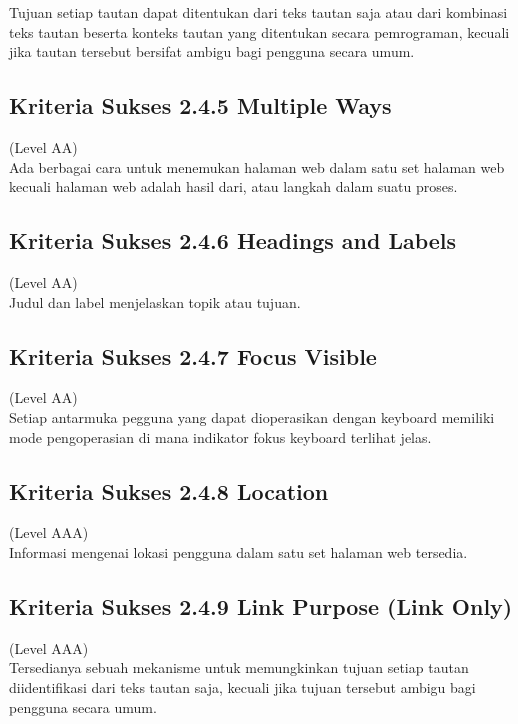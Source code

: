 Tujuan setiap tautan dapat ditentukan dari teks tautan saja atau dari kombinasi teks tautan beserta konteks tautan yang ditentukan secara pemrograman, kecuali jika tautan tersebut bersifat ambigu bagi pengguna secara umum.

\subsection{Kriteria Sukses 2.4.5 Multiple Ways}
\label{subsec:kriteria_2.4.5}
(Level AA) \\

Ada berbagai cara untuk menemukan halaman web dalam satu set halaman web kecuali halaman web adalah hasil dari, atau langkah dalam suatu proses.

\subsection{Kriteria Sukses 2.4.6 Headings and Labels}
\label{subsec:kriteria_2.4.6}
(Level AA) \\

Judul dan label menjelaskan topik atau tujuan.

\subsection{Kriteria Sukses 2.4.7 Focus Visible}
\label{subsec:kriteria_2.4.7}
(Level AA) \\

Setiap antarmuka pegguna yang dapat dioperasikan dengan keyboard memiliki mode pengoperasian di mana indikator fokus keyboard terlihat jelas.

\subsection{Kriteria Sukses 2.4.8 Location}
\label{subsec:kriteria_2.4.8}
(Level AAA) \\

Informasi mengenai lokasi pengguna dalam satu set halaman web tersedia.

\subsection{Kriteria Sukses 2.4.9 Link Purpose (Link Only)}
\label{subsec:kriteria_2.4.9}
(Level AAA) \\

Tersedianya sebuah mekanisme untuk memungkinkan tujuan setiap tautan diidentifikasi dari teks tautan saja, kecuali jika tujuan tersebut ambigu bagi pengguna secara umum.

